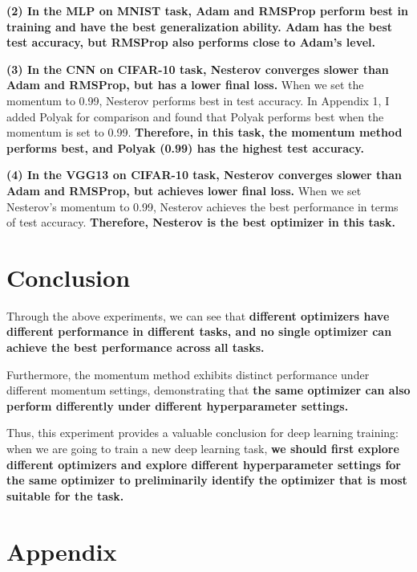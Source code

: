 \documentclass[12pt]{article}
\begin{document}
\textbf{(2) In the MLP on MNIST task, Adam and RMSProp perform best in training and have the best generalization ability. Adam has the best test accuracy, but RMSProp also performs close to Adam's level.}

\textbf{(3) In the CNN on CIFAR-10 task, Nesterov converges slower than Adam and RMSProp, but has a lower final loss.} When we set the momentum to 0.99, Nesterov performs best in test accuracy. In Appendix 1, I added Polyak for comparison and found that Polyak performs best when the momentum is set to 0.99. \textbf{Therefore, in this task, the momentum method performs best, and Polyak (0.99) has the highest test accuracy. }

\textbf{(4) In the VGG13 on CIFAR-10 task, Nesterov converges slower than Adam and RMSProp, but achieves lower final loss.} When we set Nesterov's momentum to 0.99, Nesterov achieves the best performance in terms of test accuracy. \textbf{Therefore, Nesterov is the best optimizer in this task.}

\section{Conclusion}

Through the above experiments, we can see that \textbf{different optimizers have different performance in different tasks, and no single optimizer can achieve the best performance across all tasks.}

Furthermore, the momentum method exhibits distinct performance under different momentum settings, demonstrating that \textbf{the same optimizer can also perform differently under different hyperparameter settings.}

Thus, this experiment provides a valuable conclusion for deep learning training: when we are going to train a new deep learning task, \textbf{we should first explore different optimizers and explore different hyperparameter settings for the same optimizer to preliminarily identify the optimizer that is most suitable for the task.}

\clearpage
\section*{Appendix}
\end{document}
